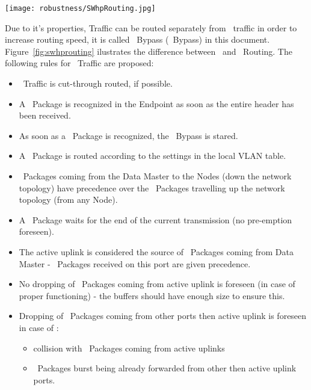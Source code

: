 \begin{center}
	\texttt{[image: robustness/SWhpRouting.jpg]}
	\label{fig:swhprouting}
\end{center}

Due to it's properties, \HP Traffic can be routed separately from \SP\ traffic
in order to increase routing speed, it is called \HighPriority\ Bypass (\HP\
Bypass) in this document. Figure~\ref{fig:swhprouting} ilustrates the difference
between
\SP\ and \HP\ Routing. The following rules for \HP\ Traffic are proposed:
\begin{itemize}
  \item \HP\ Traffic is cut-through routed, if possible.
  \item A \HP\ Package is recognized in the Endpoint as soon as the entire
header has been received.
  \item As soon as a \HP\ Package is recognized, the \HP\ Bypass is stared.
  \item A \HP\ Package is routed according to the settings in the local VLAN
table.
  \item \HP\ Packages coming from the Data Master to the Nodes (down the network
topology) have precedence over the \HP\ Packages travelling up the network
topology (from any Node).
  \item A \HP\ Package waits for the end of the current transmission (no
pre-emption foreseen). 
  \item The active uplink is considered the source of \HP\ Packages coming from
Data Master - \HP\ Packages received on this port are given precedence.
  \item No dropping of \HP\ Packages coming from active uplink is foreseen (in
case of proper functioning) - the buffers should have enough size to ensure
this.
  \item Dropping of \HP\ Packages coming from other ports then active
uplink is foreseen in case of :
  \begin{itemize}
    \item collision with \HP\ Packages coming from active uplinks 
    \item \HP\ Packages burst being already forwarded from other then active
uplink ports.
  \end{itemize}

\end{itemize}


